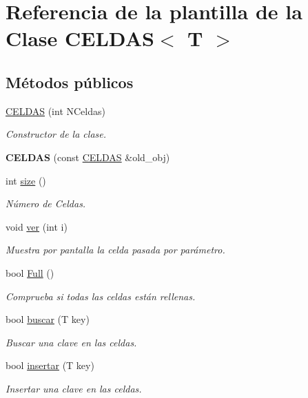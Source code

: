 \hypertarget{classCELDAS}{}\section{Referencia de la plantilla de la Clase C\+E\+L\+D\+AS$<$ T $>$}
\label{classCELDAS}
\subsection*{Métodos públicos}
\begin{DoxyCompactItemize}
\item 
\mbox{\label{classCELDAS_aae69874190ac05952611963e5a3e833b}} 
\hyperlink{classCELDAS_aae69874190ac05952611963e5a3e833b}{C\+E\+L\+D\+AS} (int N\+Celdas)
\begin{DoxyCompactList}\small\item\em Constructor de la clase. \end{DoxyCompactList}\item 
\mbox{\label{classCELDAS_a05cfbfe288a8f671843f7e2c55f9c5c7}} 
{\bfseries C\+E\+L\+D\+AS} (const \hyperlink{classCELDAS}{C\+E\+L\+D\+AS} \&old\+\_\+obj)
\item 
\mbox{\label{classCELDAS_aa441a713c1c4b3cf44651a9aed80bca4}} 
int \hyperlink{classCELDAS_aa441a713c1c4b3cf44651a9aed80bca4}{size} ()
\begin{DoxyCompactList}\small\item\em Número de Celdas. \end{DoxyCompactList}\item 
void \hyperlink{classCELDAS_a0bf3899f87a9f9123a00bb0021c6d9e7}{ver} (int i)
\begin{DoxyCompactList}\small\item\em Muestra por pantalla la celda pasada por parámetro. \end{DoxyCompactList}\item 
bool \hyperlink{classCELDAS_a42432f9d2dfe9836317b2ea90adca95c}{Full} ()
\begin{DoxyCompactList}\small\item\em Comprueba si todas las celdas están rellenas. \end{DoxyCompactList}\item 
bool \hyperlink{classCELDAS_a3e64f7ae44f98fd184cf29807964ac38}{buscar} (T key)
\begin{DoxyCompactList}\small\item\em Buscar una clave en las celdas. \end{DoxyCompactList}\item 
bool \hyperlink{classCELDAS_a2d867ad43fcbebc0eb22b3bb7c039f4a}{insertar} (T key)
\begin{DoxyCompactList}\small\item\em Insertar una clave en las celdas. \end{DoxyCompactList}\end{DoxyCompactItemize}
